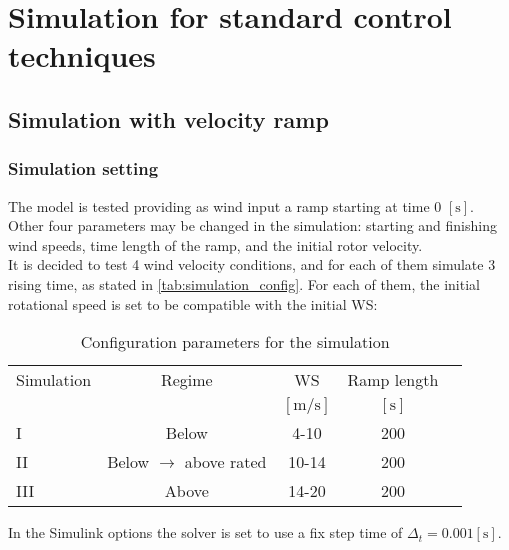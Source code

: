 \newpage
\section{Simulation for standard control techniques}\label{sec:c_basic_model_simulation}

\subsection{Simulation with velocity ramp}
\subsubsection{Simulation setting}
The model is tested providing as wind input a ramp starting at time 0 $\left[\si{\second}\right]$. Other four parameters may be changed in the simulation: starting and finishing wind speeds, time length of the ramp, and the initial rotor velocity.\\
It is decided to test 4 wind velocity conditions, and for each of them simulate 3 rising time, as stated in \autoref{tab:simulation_config}. For each of them, the initial rotational speed is set to be compatible with the initial \acrshort{WS}:

\begin{table}[htb]
    \caption{Configuration parameters for the simulation}
    \centering
    \begin{tabular}{lcccc}
    \toprule
      Simulation & Regime  & WS & Ramp length \\ 
       & & $\left[\si{\meter\per\second}\right]$ & $\left[\si{\second}\right]$ \\ \midrule       
       I & Below & 4-10 & 200  \\
       II & Below $\rightarrow$ above rated & 10-14 & 200 \\
       III & Above & 14-20 & 200  \\
       \bottomrule
    \end{tabular}
    \label{tab:simulation_config}
\end{table}

In the Simulink options the solver is set to use a fix step time of $\Delta_t=0.001 \left[\si{\second}\right]$.

